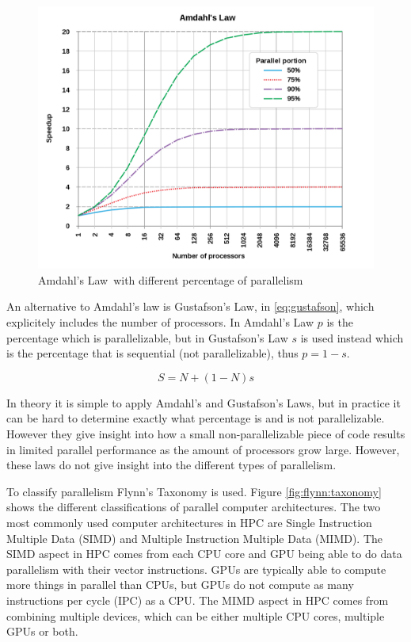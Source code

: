 \begin{figure}[H]
    \centering
    \includegraphics[scale=0.17]{Figures/amdahl.png}
    \caption[]{Amdahl's Law\protect\footnotemark\ with different percentage of parallelism}
    \label{fig:amdahl}
\end{figure} 

An alternative to Amdahl's law is Gustafson's Law, in \eqref{eq:gustafson}, which explicitely includes the number of processors. In Amdahl's Law $p$ is the percentage which is parallelizable, but in Gustafson's Law $s$ is used instead which is the percentage that is sequential (not parallelizable), thus $p = 1-s$.

\begin{equation}
  \label{eq:gustafson}
  S = N + (1 - N)s
\end{equation}

In theory it is simple to apply Amdahl's and Gustafson's Laws, but in practice it can be hard to determine exactly what percentage is and is not parallelizable. However they give insight into how a small non-parallelizable piece of code results in limited parallel performance as the amount of processors grow large. However, these laws do not give insight into the different types of parallelism.

To classify parallelism Flynn's Taxonomy is used. Figure \ref{fig:flynn:taxonomy} shows the different classifications of parallel computer architectures. The two most commonly used computer architectures in HPC are Single Instruction Multiple Data (SIMD) and Multiple Instruction Multiple Data (MIMD). The SIMD aspect in HPC comes from each CPU core and GPU being able to do data parallelism with their vector instructions. GPUs are typically able to compute more things in parallel than CPUs, but GPUs do not compute as many instructions per cycle (IPC) as a CPU. The MIMD aspect in HPC comes from combining multiple devices, which can be either multiple CPU cores, multiple GPUs or both.

